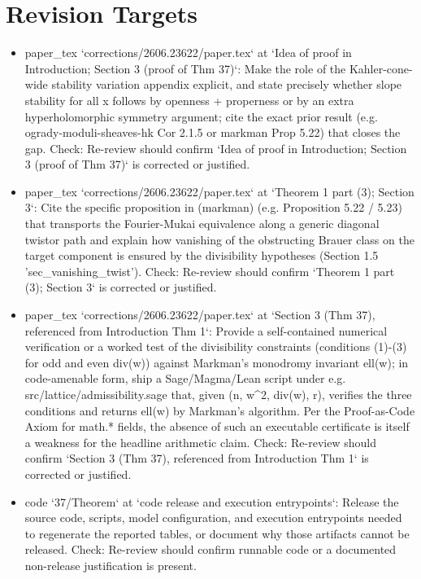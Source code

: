 \documentclass[11pt]{article}
\begin{document}
\section*{Revision Targets}
\begin{itemize}[leftmargin=*]
  \item [open] paper\_tex `corrections/2606.23622/paper.tex` at `Idea of proof in Introduction; Section 3 (proof of Thm 37)`: Make the role of the Kahler-cone-wide stability variation appendix explicit, and state precisely whether slope stability for all x follows by openness + properness or by an extra hyperholomorphic symmetry argument; cite the exact prior result (e.g. ogrady-moduli-sheaves-hk Cor 2.1.5 or markman Prop 5.22) that closes the gap. Check: Re-review should confirm `Idea of proof in Introduction; Section 3 (proof of Thm 37)` is corrected or justified.
  \item [open] paper\_tex `corrections/2606.23622/paper.tex` at `Theorem 1 part (3); Section 3`: Cite the specific proposition in (markman) (e.g. Proposition 5.22 / 5.23) that transports the Fourier-Mukai equivalence along a generic diagonal twistor path and explain how vanishing of the obstructing Brauer class on the target component is ensured by the divisibility hypotheses (Section 1.5 'sec\_vanishing\_twist'). Check: Re-review should confirm `Theorem 1 part (3); Section 3` is corrected or justified.
  \item [open] paper\_tex `corrections/2606.23622/paper.tex` at `Section 3 (Thm 37), referenced from Introduction Thm 1`: Provide a self-contained numerical verification or a worked test of the divisibility constraints (conditions (1)-(3) for odd and even div(w)) against Markman's monodromy invariant ell(w); in code-amenable form, ship a Sage/Magma/Lean script under e.g. src/lattice/admissibility.sage that, given (n, w\^{}2, div(w), r), verifies the three conditions and returns ell(w) by Markman's algorithm. Per the Proof-as-Code Axiom for math.* fields, the absence of such an executable certificate is itself a weakness for the headline arithmetic claim. Check: Re-review should confirm `Section 3 (Thm 37), referenced from Introduction Thm 1` is corrected or justified.
  \item [open] code `37/Theorem` at `code release and execution entrypoints`: Release the source code, scripts, model configuration, and execution entrypoints needed to regenerate the reported tables, or document why those artifacts cannot be released. Check: Re-review should confirm runnable code or a documented non-release justification is present.

\end{itemize}
\end{document}
